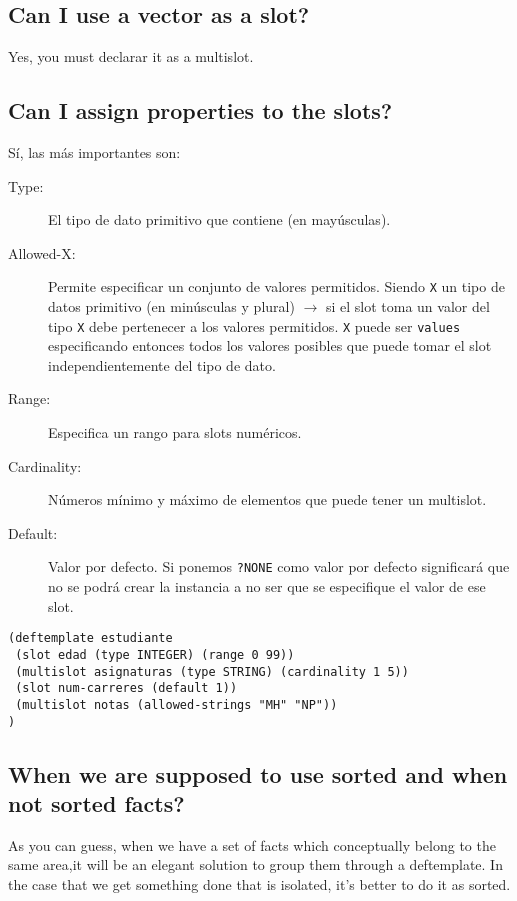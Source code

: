 \documentclass[11pt,svgnames]{scrbook}
\begin{document}
\subsection{Can I use a vector as a slot?}

Yes, you must declarar it as a multislot.

\subsection{Can I assign properties to the slots?}

Sí, las más importantes son:
\begin{description}
 \item[Type:]
 El tipo de dato primitivo que contiene (en mayúsculas).
\item [Allowed-X:] Permite especificar un conjunto de valores permitidos. Siendo \texttt{X} un tipo
de datos primitivo (en minúsculas y plural) $\rightarrow$ si el slot toma un valor del tipo
\texttt{X} debe pertenecer a los valores permitidos. \texttt{X} puede ser \texttt{values}
especificando entonces todos los valores posibles que puede tomar el slot independientemente del
tipo de dato.
\item [Range:] Especifica un rango para slots numéricos.
\item [Cardinality:] Números mínimo y máximo de elementos que puede tener un multislot.
\item [Default:] Valor por defecto. Si ponemos \texttt{?NONE} como valor por defecto significará que
no se podrá crear la instancia a no ser que se especifique el valor de ese slot.
 \end{description}

\begin{verbatim}
(deftemplate estudiante
 (slot edad (type INTEGER) (range 0 99))
 (multislot asignaturas (type STRING) (cardinality 1 5))
 (slot num-carreres (default 1))
 (multislot notas (allowed-strings "MH" "NP"))
)
\end{verbatim}

\subsection{When we are supposed to use sorted and when not sorted facts?}

As you can guess, when we have a set of facts which conceptually belong to the same area,it will be an elegant solution to group them through a deftemplate. In the case that we get something done that is isolated, it's better to do it as sorted.
\end{document}
